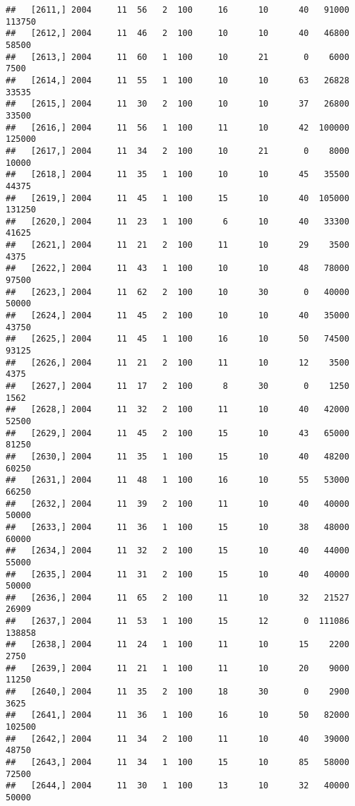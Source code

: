\documentclass{article}\usepackage[]{graphicx}\usepackage[]{color}
\makeatletter
\newenvironment{kframe}{%
 \def\at@end@of@kframe{}%
 \ifinner\ifhmode%
  \def\at@end@of@kframe{\end{minipage}}%
  \begin{minipage}{\columnwidth}%
 \fi\fi%
 \def\FrameCommand##1{\hskip\@totalleftmargin \hskip-\fboxsep
 \colorbox{shadecolor}{##1}\hskip-\fboxsep
     \hskip-\linewidth \hskip-\@totalleftmargin \hskip\columnwidth}%
 \MakeFramed {\advance\hsize-\width
   \@totalleftmargin\z@ \linewidth\hsize
   \@setminipage}}%
 {\par\unskip\endMakeFramed%
 \at@end@of@kframe}
\newenvironment{knitrout}{}{} %
\makeatother
\begin{document}
\begin{knitrout}
\begin{kframe}
\begin{verbatim}
##   [2611,] 2004     11  56   2  100     16      10      40   91000  113750
##   [2612,] 2004     11  46   2  100     10      10      40   46800   58500
##   [2613,] 2004     11  60   1  100     10      21       0    6000    7500
##   [2614,] 2004     11  55   1  100     10      10      63   26828   33535
##   [2615,] 2004     11  30   2  100     10      10      37   26800   33500
##   [2616,] 2004     11  56   1  100     11      10      42  100000  125000
##   [2617,] 2004     11  34   2  100     10      21       0    8000   10000
##   [2618,] 2004     11  35   1  100     10      10      45   35500   44375
##   [2619,] 2004     11  45   1  100     15      10      40  105000  131250
##   [2620,] 2004     11  23   1  100      6      10      40   33300   41625
##   [2621,] 2004     11  21   2  100     11      10      29    3500    4375
##   [2622,] 2004     11  43   1  100     10      10      48   78000   97500
##   [2623,] 2004     11  62   2  100     10      30       0   40000   50000
##   [2624,] 2004     11  45   2  100     10      10      40   35000   43750
##   [2625,] 2004     11  45   1  100     16      10      50   74500   93125
##   [2626,] 2004     11  21   2  100     11      10      12    3500    4375
##   [2627,] 2004     11  17   2  100      8      30       0    1250    1562
##   [2628,] 2004     11  32   2  100     11      10      40   42000   52500
##   [2629,] 2004     11  45   2  100     15      10      43   65000   81250
##   [2630,] 2004     11  35   1  100     15      10      40   48200   60250
##   [2631,] 2004     11  48   1  100     16      10      55   53000   66250
##   [2632,] 2004     11  39   2  100     11      10      40   40000   50000
##   [2633,] 2004     11  36   1  100     15      10      38   48000   60000
##   [2634,] 2004     11  32   2  100     15      10      40   44000   55000
##   [2635,] 2004     11  31   2  100     15      10      40   40000   50000
##   [2636,] 2004     11  65   2  100     11      10      32   21527   26909
##   [2637,] 2004     11  53   1  100     15      12       0  111086  138858
##   [2638,] 2004     11  24   1  100     11      10      15    2200    2750
##   [2639,] 2004     11  21   1  100     11      10      20    9000   11250
##   [2640,] 2004     11  35   2  100     18      30       0    2900    3625
##   [2641,] 2004     11  36   1  100     16      10      50   82000  102500
##   [2642,] 2004     11  34   2  100     11      10      40   39000   48750
##   [2643,] 2004     11  34   1  100     15      10      85   58000   72500
##   [2644,] 2004     11  30   1  100     13      10      32   40000   50000

\end{verbatim}
\end{kframe}
\end{knitrout}
\end{document}
